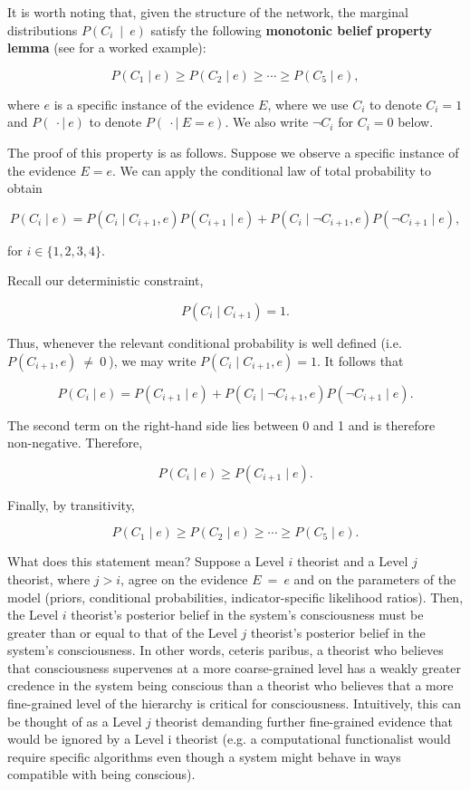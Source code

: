 \documentclass[11pt, a4paper, onecolumn, gdm]{google}
\begin{document}
It is worth noting that, given the structure of the network, the marginal distributions \(P\left( C_{i}\  \mid \ e \right)\) satisfy the following \textbf{monotonic belief property lemma} (see  for a worked example):

\[
P\left( C_{1} \mid e \right) \geq P\left( C_{2} \mid e \right) \geq \cdots \geq P\left( C_{5} \mid e \right),
\]

where \(e\) is a specific instance of the evidence \(E\), where we use \(C_{i}\) to denote \(C_{i} = 1\) and \(P(\  \cdot \mid \ e)\) to denote \(P(\  \cdot \mid \ E = e)\).
We also write \(\neg C_{i}\) for \(C_{i} = 0\) below.

The proof of this property is as follows.
Suppose we observe a specific instance of the evidence \(E = e\).
We can apply the conditional law of total probability to obtain

\[
P\left( C_{i} \mid e \right) = P\left( C_{i} \mid C_{i + 1},e \right)P\left( C_{i + 1} \mid e \right) + P\left( C_{i} \mid \neg C_{i + 1},e \right)P\left( \neg C_{i + 1} \mid e \right),
\]

for \(i \in \{ 1,2,3,4\}\).

Recall our deterministic constraint,

\[
P\left( C_{i} \mid C_{i + 1} \right) = 1.
\]

Thus, whenever the relevant conditional probability is well defined (i.e. \(P\left( C_{i + 1},e \right)\  \neq \ 0\ \)), we may write \(P\left( C_{i} \mid C_{i + 1},e \right) = 1.\) It follows that

\[
P\left( C_{i} \mid e \right) = P\left( C_{i + 1} \mid e \right) + P\left( C_{i} \mid \neg C_{i + 1},e \right)P\left( \neg C_{i + 1} \mid e \right).
\]

The second term on the right-hand side lies between 0 and 1 and is therefore non-negative.
Therefore,

\[
P\left( C_{i} \mid e \right) \geq P\left( C_{i + 1} \mid e \right).
\]

Finally, by transitivity,

\[
P\left( C_{1} \mid e \right) \geq P\left( C_{2} \mid e \right) \geq \cdots \geq P\left( C_{5} \mid e \right).
\]

What does this statement mean?
Suppose a Level \(i\) theorist and a Level \(j\) theorist, where \(j > i\), agree on the evidence \(E\  = \ e\) and on the parameters of the model (priors, conditional probabilities, indicator-specific likelihood ratios).
Then, the Level \(i\) theorist's posterior belief in the system's consciousness must be greater than or equal to that of the Level \(j\) theorist's posterior belief in the system's consciousness.
In other words, ceteris paribus, a theorist who believes that consciousness supervenes at a more coarse-grained level has a weakly greater credence in the system being conscious than a theorist who believes that a more fine-grained level of the hierarchy is critical for consciousness.
Intuitively, this can be thought of as a Level \(j\) theorist demanding further fine-grained evidence that would be ignored by a Level i theorist (e.g. a computational functionalist would require specific algorithms even though a system might behave in ways compatible with being conscious).
\end{document}
